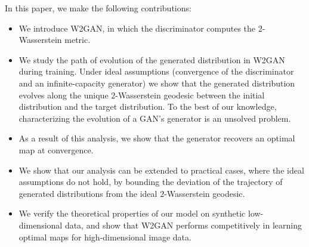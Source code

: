 \documentclass[runningheads]{llncs}
\newcommand\amjad[1]{\textcolor{blue}{Amjad: #1}}
\begin{document}
In this paper, we make the following contributions:
\begin{itemize} [noitemsep,topsep=0pt]
\item We introduce W2GAN, in which the discriminator computes the $2$-Wasserstein metric.
\item We study the path of evolution of the generated distribution in W2GAN during training. Under ideal assumptions (convergence of the discriminator and an infinite-capacity generator) we show that the generated distribution evolves along the unique $2$-Wasserstein geodesic between the initial distribution and the target distribution. To the best of our knowledge, characterizing the evolution of a GAN's generator is an unsolved problem.
\item As a result of this analysis, we show that the generator recovers an optimal map at convergence.
\item We show that our analysis can be extended to practical cases, where the ideal assumptions do not hold, by bounding the deviation of the trajectory of generated distributions from the ideal $2$-Wasserstein geodesic.
\item We verify the theoretical properties of our model on synthetic low-dimensional data, and show that W2GAN performs competitively in learning optimal maps for high-dimensional image data.
\end{itemize}

\end{document}
